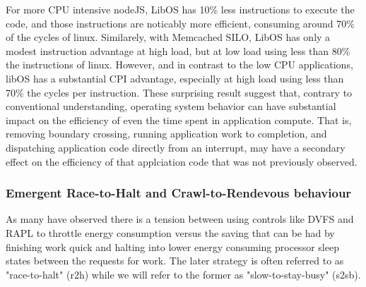 For more CPU intensive nodeJS, LibOS has 10\% less instructions to execute the code, and those instructions are noticably more efficient, consuming around 70\% of the cycles of linux.  
Similarely, with Memcached SILO, LibOS has only a modest instruction advantage at high load, but at low load using less than 80\% the instructions of linux. 
However, and in contrast to the low CPU applications, libOS has a substantial CPI advantage, especially at high load using less than 70\% the cycles per instruction.
These surprising result suggest that, contrary to conventional understanding, operating system behavior can have substantial impact on the efficiency of even the time spent in application compute.  
That is, removing boundary crossing, running application work to completion, and dispatching application code directly from an interrupt, may have a secondary effect on the efficiency of that applciation code that was not previously observed. 




  
 
%
%
%

\subsubsection{Emergent Race-to-Halt and Crawl-to-Rendevous behaviour}

As many have observed there is a tension between using controls like DVFS and RAPL to throttle energy consumption versus the saving that can be had by finishing work quick and halting into lower energy consuming processor sleep states between the requests for work.  The later strategy is often referred to as "race-to-halt" (r2h) while we will refer to the former as "slow-to-stay-busy" (s2sb).  

